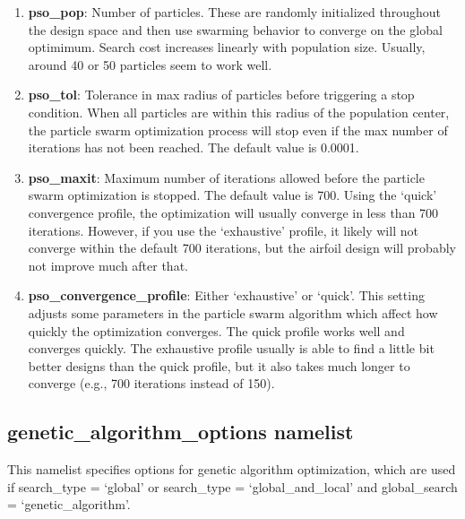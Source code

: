 \documentclass[11pt]{article}
\begin{document}
\begin{enumerate}
\item{\textbf{pso\_pop}: Number of particles.  These are randomly initialized throughout 
the design space and then use swarming behavior to converge on the global optimimum.  
Search cost increases linearly with population size.  Usually, around 40 or 50 particles 
seem to work well.}
\item{\textbf{pso\_tol}: Tolerance in max radius of particles before triggering a stop
condition.  When all particles are within this radius of the population center, the
particle swarm optimization process will stop even if the max number of iterations has
not been reached. The default value is 0.0001.}
\item{\textbf{pso\_maxit}: Maximum number of iterations allowed before the particle swarm
optimization is stopped.  The default value is 700.  Using the 
`quick' convergence profile, the optimization will usually converge in less than 700
iterations. However, if you use the `exhaustive' profile, it likely will not converge
within the default 700 iterations, but the airfoil design will probably not improve much 
after that.}
\item{\textbf{pso\_convergence\_profile}: Either `exhaustive' or `quick'.  This setting
adjusts some parameters in the particle swarm algorithm which affect how quickly the
optimization converges.  The quick profile works well and converges quickly.  The
exhaustive profile usually is able to find a little bit better designs than the quick
profile, but it also takes much longer to converge (e.g., 700 iterations instead of 150).}
\end{enumerate}

\subsection{genetic\_algorithm\_options namelist}

This namelist specifies options for genetic algorithm optimization, which are used if
search\_type = `global' or search\_type = `global\_and\_local' and global\_search =
`genetic\_algorithm'.
\end{document}
